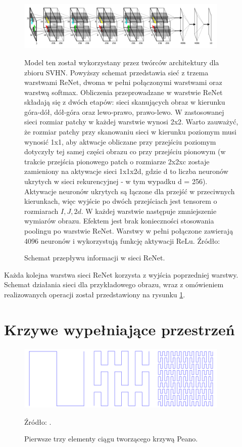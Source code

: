 \documentclass[oneside, mag]{mgr}
\begin{document}
\begin{figure}
\centering
	\includegraphics[width=0.9\textwidth]{img/ReNetArch.png}
	\caption{Schemat przepływu informacji w sieci ReNet.} Model ten został wykorzystany przez twórców architektury dla zbioru SVHN. Powyższy schemat przedstawia sieć z trzema warstwami ReNet, dwoma w pełni połączonymi warstwami oraz warstwą softmax. Obliczenia przeprowadzane w warstwie ReNet składają się z dwóch etapów: sieci skanujących obraz w kierunku góra-dół, dół-góra oraz lewo-prawo, prawo-lewo. W zastosowanej sieci rozmiar patchy w każdej warstwie wynosi 2x2. Warto zauważyć, że rozmiar patchy przy skanowaniu sieci w kierunku poziomym musi wynosić 1x1, aby aktwacje obliczane przy przejściu poziomym dotyczyły tej samej części obrazu co przy przejściu pionowym (w trakcie przejścia pionowego patch o rozmiarze 2x2xc zostaje zamieniony na aktywacje sieci 1x1x2d, gdzie d to liczba neuronów ukrytych w sieci rekurencyjnej - w tym wypadku d = 256). Aktywacje neuronów ukrytych są łączone dla przejść w przeciwnych kierunkach, więc wyjście po dwóch przejściach jest tensorem o rozmiarach $I,J,2d$. W każdej warstwie następuje zmniejszenie wymiarów obrazu. Efektem jest brak konieczności stosowania poolingu po warstwie ReNet. Warstwy w pełni połączone zawierają 4096 neuronów i wykorzystują funkcję aktywacji ReLu. Źródło: \cite{DBLP:journals/corr/VisinKCMCB15}
	\label{fig:ReNet}
\end{figure}

Każda kolejna warstwa sieci ReNet korzysta z wyjścia poprzedniej warstwy. Schemat działania sieci dla przykładowego obrazu, wraz z omówieniem realizowanych operacji został przedstawiony na rysunku \ref{fig:ReNet}.

\section{Krzywe wypełniające przestrzeń}

\begin{figure}
\centering
	\includegraphics[width=0.9\textwidth]{img/peano_curve.png}
	\caption{Pierwsze trzy elementy ciągu tworzącego krzywą Peano.} Źródło: \cite{peano}.
	\label{fig:peano}
\end{figure}
\end{document}

